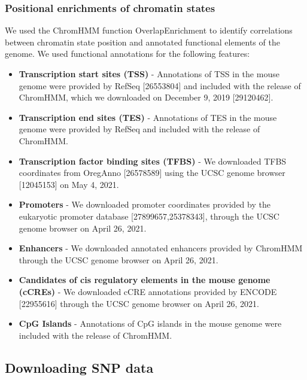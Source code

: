 \documentclass[10pt,letterpaper]{article}
\providecommand{\tightlist}{%
  \setlength{\itemsep}{0pt}\setlength{\parskip}{0pt}}
\begin{document}
\hypertarget{positional-enrichments-of-chromatin-states}{%
\subsubsection{Positional enrichments of chromatin
states}\label{positional-enrichments-of-chromatin-states}}

We used the ChromHMM function OverlapEnrichment to identify correlations
between chromatin state position and annotated functional elements of
the genome. We used functional annotations for the following features:

\begin{itemize}
\tightlist
\item
  \textbf{Transcription start sites (TSS)} - Annotations of TSS in the
  mouse genome were provided by RefSeq {[}26553804{]} and included with
  the release of ChromHMM, which we downloaded on December 9, 2019
  {[}29120462{]}.
\item
  \textbf{Transcription end sites (TES)} - Annotations of TES in the
  mouse genome were provided by RefSeq and included with the release of
  ChromHMM.
\item
  \textbf{Transcription factor binding sites (TFBS)} - We downloaded
  TFBS coordinates from OregAnno {[}26578589{]} using the UCSC genome
  browser {[}12045153{]} on May 4, 2021.
\item
  \textbf{Promoters} - We downloaded promoter coordinates provided by
  the eukaryotic promoter database {[}27899657,25378343{]}, through the
  UCSC genome browser on April 26, 2021.
\item
  \textbf{Enhancers} - We downloaded annotated enhancers provided by
  ChromHMM through the UCSC genome browser on April 26, 2021.
\item
  \textbf{Candidates of cis regulatory elements in the mouse genome
  (cCREs)} - We downloaded cCRE annotations provided by ENCODE
  {[}22955616{]} through the UCSC genome browser on April 26, 2021.
\item
  \textbf{CpG Islands} - Annotations of CpG islands in the mouse genome
  were included with the release of ChromHMM.
\end{itemize}

\hypertarget{downloading-snp-data}{%
\subsection{Downloading SNP data}\label{downloading-snp-data}}
\end{document}
